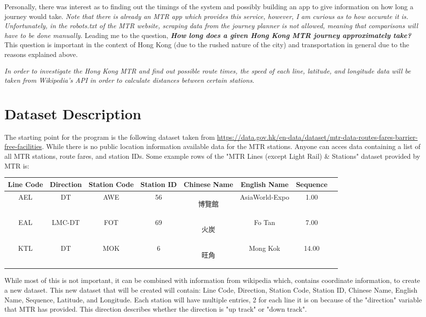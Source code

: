 \documentclass[fontsize=11pt]{article}
\begin{document}
Personally, there was interest as to finding out the timings of the system and possibly building an app to give information on how long a journey would take.\textit{ Note that there is already an MTR app which provides this service, however, I am curious as to how accurate it is. Unfortunately, in the robots.txt of the MTR website, scraping data from the journey planner is not allowed, meaning that comparisons will have to be done manually.} Leading me to the question, \textit{\textbf{How long does a given Hong Kong MTR journey approximately take?}} This question is important in the context of Hong Kong (due to the rushed nature of the city) and transportation in general due to the reasons explained above. 

\textit{In order to investigate the Hong Kong MTR and find out possible route times, the speed of each line, latitude, and longitude data will be taken from Wikipedia's API in order to calculate distances between certain stations. }





\section*{Dataset Description}
The starting point for the program is the following dataset taken from \url{https://data.gov.hk/en-data/dataset/mtr-data-routes-fares-barrier-free-facilities}.
While there is no public location information available data for the MTR stations. Anyone can acces data containing a list of all MTR stations, route fares, and station IDs.  Some example rows of the "MTR Lines (except Light Rail) & Stations" dataset provided by MTR is: 
\begin{center}
\begin{tabular}{||c | c | c | c | c | c | c | c||} 
\hline
Line Code & Direction & Station Code & Station ID & Chinese Name & English Name & Sequence\\ [0.5ex] 
\hline \hline
AEL & DT & AWE & 56 & \begin{CJK*}{UTF8}{bsmi} 博覽館 \end{CJK*} & AsiaWorld-Expo & 1.00 \\
\hline
EAL & LMC-DT & FOT & 69 & \begin{CJK*}{UTF8}{bsmi} 火炭 \end{CJK*} & Fo Tan & 7.00 \\
\hline
KTL & DT & MOK & 6 & \begin{CJK*}{UTF8}{bsmi} 旺角 \end{CJK*} & Mong Kok & 14.00\\ [1ex] 
\hline
\end{tabular}
\end{center}
While most of this is not important, it can be combined with information from wikipedia which, contains coordinate information, to create a new dataset. This new dataset that will be created will contain: Line Code, Direction, Station Code, Station ID, Chinese Name, English Name, Sequence, Latitude, and Longitude. Each station will have multiple entries, 2 for each line it is on because of the "direction" variable that MTR has provided. This direction describes whether the direction is "up track" or "down track". 
\end{document}
